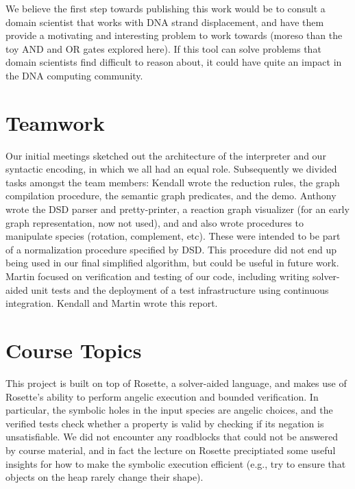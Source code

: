 \documentclass{article}[10pt]
\begin{document}
We believe the first step towards publishing this work would be to
consult a domain scientist that works with DNA strand displacement,
and have them provide a motivating and interesting problem to work
towards (moreso than the toy AND and OR gates explored here). 
If this tool can solve problems that domain scientists find difficult
to reason about, it could have quite an impact in the DNA computing
community.

\section{Teamwork}

Our initial meetings sketched out the architecture of the interpreter and our
syntactic encoding, in which we all had an equal role. Subsequently we divided
tasks amongst the team members: Kendall wrote the reduction rules, the graph
compilation procedure, the semantic graph predicates, and the demo. Anthony
wrote the DSD parser and pretty-printer, a reaction graph visualizer (for an
early graph representation, now not used), and and also wrote procedures to
manipulate species (rotation, complement, etc). These were intended to be
part of a normalization procedure specified by DSD. This procedure did not end
up being used in our final simplified algorithm, but could be useful in future
work.  Martin focused on verification and testing of our code, including writing
solver-aided unit tests and the deployment of a test infrastructure using
continuous integration. Kendall and Martin wrote this report.

\section{Course Topics}

This project is built on top of Rosette, a solver-aided language, and makes
use of Rosette's ability to perform angelic execution and bounded verification.
In particular, the symbolic holes in the input species are angelic choices,
and the verified tests check whether a property is valid by checking if its
negation is unsatisfiable. We did not encounter any roadblocks that could
not be answered by course material, and in fact the lecture on Rosette
preciptiated some useful insights for how to make the symbolic execution
efficient (e.g., try to ensure that objects on the heap rarely change their
shape).
\end{document}
